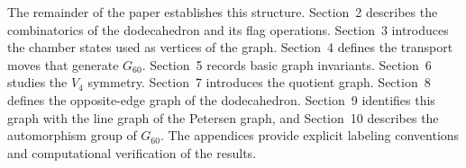 The remainder of the paper establishes this structure.
Section~2 describes the combinatorics of the dodecahedron and its
flag operations.  Section~3 introduces the chamber states used as
vertices of the graph.  Section~4 defines the transport moves that
generate $G_{60}$.  Section~5 records basic graph invariants.
Section~6 studies the $V_4$ symmetry.  Section~7 introduces the
quotient graph.  Section~8 defines the opposite-edge graph of the
dodecahedron.  Section~9 identifies this graph with the line graph
of the Petersen graph, and Section~10 describes the automorphism
group of $G_{60}$.  The appendices provide explicit labeling
conventions and computational verification of the results.
